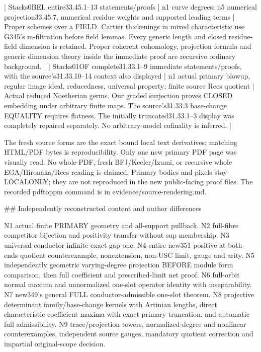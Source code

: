 \documentclass[11pt]{article}
\begin{document}
\begin{GrantData}
| Stacks0BEL entire33.45.1--13 statements/proofs | n1 curve degrees; n5 numerical projection33.45.7, numerical residue weights and supported leading terms | Proper schemes over a FIELD. Cartier thickenings in mixed characteristic use G345's m-filtration before field lemmas. Every generic length and closed residue-field dimension is retained. Proper coherent cohomology, projection formula and generic dimension theory inside the immediate proof are recursive ordinary background. |
| Stacks01OF complete31.33.1--9 immediate statements/proofs, with the source's31.33.10--14 context also displayed | n1 actual primary blowup, regular image ideal, reducedness, universal property; finite source Rees quotient | Actual reduced Noetherian germs. Our graded surjection proves CLOSED embedding under arbitrary finite maps. The source's31.33.3 base-change EQUALITY requires flatness. The initially truncated31.33.1--3 display was completely repaired separately. No arbitrary-model cofinality is inferred. |

The fresh source forms are the exact bound local text derivatives; matching HTML/PDF bytes is reproducibility. Only one new primary PDF page was visually read. No whole-PDF, fresh BFJ/Keeler/Izumi, or recursive whole EGA/Hironaka/Rees reading is claimed. Primary bodies and pixels stay LOCALONLY; they are not reproduced in the new public-facing proof files. The recorded pdftoppm command is in evidence/source-rendering.md.

## Independently reconstructed content and author differences

N1 actual finite PRIMARY geometry and all-support pullback. N2 full-fibre competitor bijection and positivity transfer without sup membership. N3 universal conductor-infinite exact gap one. N4 entire new351 positive-at-both-ends quotient counterexample, nonextension, non-USC limit, gauge and arity. N5 independently geometric varying-degree projection BEFORE module form comparison, then full coefficient and prescribed-limit net proof. N6 full-orbit normal maxima and unnormalized one-slot operator identity with inseparability. N7 new349's general FULL conductor-admissible one-slot theorem. N8 projective determinant family/base-change kernels with Artinian lengths, direct characteristic coefficient maxima with exact primary truncation, and automatic full admissibility. N9 trace/projection towers, normalized-degree and nonlinear counterexamples, independent source gauges, mandatory quotient correction and impartial original-scope decision.


\end{GrantData}
\end{document}
